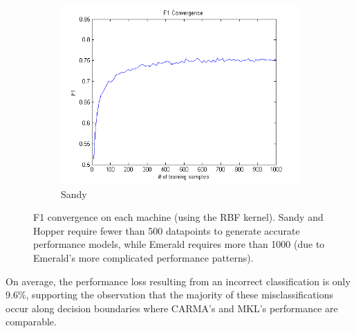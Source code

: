 \begin{figure}[t]
\begin{subfigure}[t]{0.33\textwidth}
            \includegraphics[width=\textwidth]{figures/F1_convergence_sandy.png}
            \caption{Sandy}
            \label{f:F1_sandy}
        \end{subfigure}
        \caption{F1 convergence on each machine (using the RBF kernel). Sandy and Hopper require fewer than 500 datapoints to generate accurate performance models, while Emerald requires more than 1000 (due to Emerald's more complicated performance patterns).}
    \label{fig:convergence}
\end{figure}

On average, the performance loss resulting from an incorrect classification is only 9.6\%, supporting the observation that the majority of these misclassifications occur along decision boundaries where CARMA's and MKL's performance are comparable.
